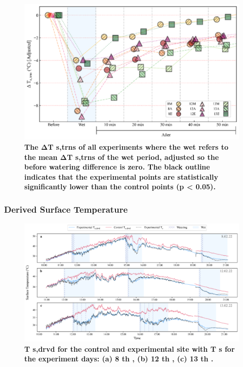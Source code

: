\documentclass[final,3p,times,authoryear]{elsarticle}
\begin{document}
{\begin{figure}
\centering
\includegraphics[trim={0 0 0 0},clip,scale=1.0]{pict045.png}
\caption{\bf The ΔT s,trns of all experiments where the wet refers to the mean ΔT s,trns of the wet period,
adjusted so the before watering difference is zero. The black outline indicates that the experimental points
are statistically significantly lower than the control points (p < 0.05).}
 \label{fig:7.16}
\end{figure}

\subsubsection{Derived Surface Temperature}\label{sec:appendix7.5.10}

\begin{figure}
\centering
\includegraphics[trim={0 0 0 0},clip,scale=1.0]{pict028.png}
\caption{\bf T s,drvd for the control and experimental site with T s for the experiment days: (a) 8 th , (b) 12 th ,
(c) 13 th .}
 \label{fig:7.17}
\end{figure}


}
\end{document}
